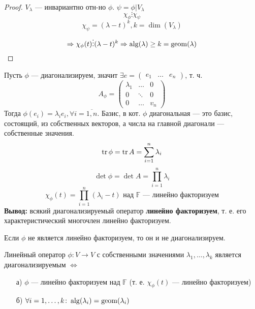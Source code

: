 \begin{proof}
  $V_\lambda$ --- инвариантно отн-но $\phi$. $\psi = \phi|V_\lambda$
  \[
  \chi_\phi \vdots \chi_\psi
  \]
  \[
  \chi_\psi = (\lambda - t)^{k}, k = \dim (V_\lambda)
  \]
  \[
  \Rightarrow \chi_\phi(t) \vdots (\lambda - t)^{k} \Rightarrow \operatorname{alg}(\lambda) \geq k = \operatorname{geom}(\lambda)
  \]
\end{proof}
\begin{note}
  Пусть $\phi$ --- диагонализируем, значит $\exists e = \begin{pmatrix}e_1 & \ldots & e_n \end{pmatrix}$, т. ч.
  \[
    A_\phi = \begin{pmatrix} \lambda_1 & \ldots & 0 \\ 0 & \ddots & 0 \\ 0 & \ldots & v_n \end{pmatrix}
  \]
  Тогда $\phi(e_i) = \lambda_i e_i, \forall i = \overline{1,n}$. Базис, в кот. $\phi$ диагональная --- это базис, состоящий, из собственных векторов, а числа на главной диагонали --- собственные значения.
  \[
    \operatorname{tr} \phi = \operatorname{tr} A = \sum_{i = 1}^{n} \lambda_i
  \]
  \[
    \det \phi = \det A = \prod_{i = 1}^{n} \lambda_i
  \]
  \[
    \chi_\phi(t) = \prod_{i = 1}^{n}(\lambda_i - t) \text{ над $\mathbb{F}$ --- линейно факторизуем}
  \]
  \textbf{Вывод:} всякий диагонализируемый оператор \textbf{линейно факторизуем}, т. е. его характеристический многочлен линейно факторизуем.
\end{note}
\begin{consequence}
  \label{consequence:04_4}
  Если $\phi$ не является линейно факторизуем, то он и не диагонализируем.
\end{consequence}
\begin{theorem}
\label{theorem:04_2}
  Линейный оператор $\phi \colon V \rightarrow V$ с собственными значениями $\lambda_1, \ldots, \lambda_k$ является диагонализируемым $\iff$
  \begin{itemize}
    \item [а) ] $\phi$ --- линейно факторизуем над $\mathbb{F}$ (т. е. $\chi_\phi(t)$ --- линейно факторизуем)
    \item [б) ] $\forall i = 1, \ldots, k \colon \operatorname{alg}(\lambda_i) = \operatorname{geom}(\lambda_i)$
  \end{itemize}
\end{theorem}
